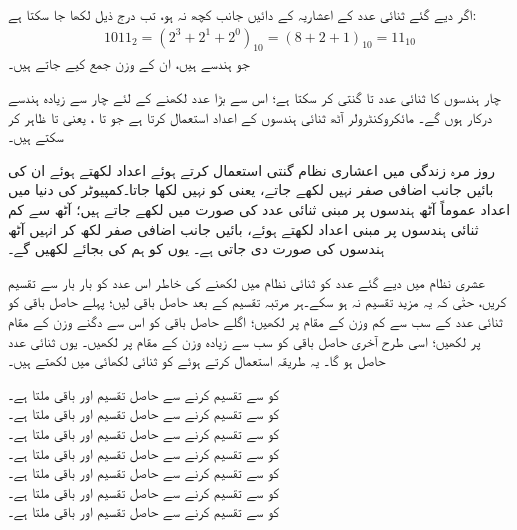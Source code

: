 اگر دیے گئے ثنائی عدد کے اعشاریہ کے دائیں جانب کچھ نہ ہو، تب درج ذیل لکھا جا سکتا ہے:
\begin{align}
1011_2=(2^3+2^1+2^0)_{10}=(8+2+1)_{10}=11_{10}
\end{align}
 جو ہندسے  ہیں، ان کے وزن جمع کیے جاتے ہیں۔

چار ہندسوں کا ثنائی عدد  تا  گنتی کر سکتا ہے؛ اس سے بڑا عدد لکھنے کے لئے چار سے زیادہ ہندسے درکار ہوں گے۔ مائکروکنٹرولر آٹھ ثنائی ہندسوں کے اعداد استعمال کرتا ہے جو  تا ، یعنی  تا  ظاہر کر سکتے ہیں۔

روز مرہ زندگی میں اعشاری نظام گنتی استعمال کرتے ہوئے اعداد لکھتے ہوئے ان کی بائیں جانب اضافی صفر نہیں لکھے جاتے، یعنی  کو  نہیں لکھا جاتا۔کمپیوٹر کی دنیا میں اعداد عموماً آٹھ ہندسوں پر مبنی ثنائی عدد کی صورت میں لکھے جاتے ہیں؛ آٹھ سے کم ثنائی ہندسوں پر مبنی اعداد لکھتے ہوئے، بائیں جانب اضافی صفر لکھ کر انہیں آٹھ ہندسوں کی صورت دی جاتی ہے۔ یوں  کو ہم  کی بجائے  لکھیں گے۔


عشری  نظام میں دیے گئے عدد کو ثنائی نظام میں لکھنے کی خاطر اس عدد کو بار بار  سے تقسیم کریں، حتٰی کہ یہ مزید تقسیم نہ ہو سکے۔ہر مرتبہ تقسیم کے بعد حاصل باقی لیں؛ پہلے حاصل باقی کو ثنائی عدد کے سب سے کم وزن کے مقام پر لکھیں؛ اگلے حاصل باقی کو اس سے دگنے وزن کے مقام پر لکھیں؛ اسی طرح آخری حاصل باقی کو سب سے زیادہ وزن کے مقام پر لکھیں۔ یوں ثنائی عدد حاصل ہو گا۔	یہ طریقہ استعمال کرتے ہوئے  کو ثنائی لکھائی میں لکھتے ہیں۔

 کو  سے تقسیم کرنے سے حاصل تقسیم  اور باقی  ملتا ہے۔\\
 کو  سے تقسیم کرنے سے حاصل تقسیم  اور باقی  ملتا ہے۔\\
 کو  سے تقسیم کرنے سے حاصل تقسیم  اور باقی  ملتا ہے۔\\
 کو  سے تقسیم کرنے سے حاصل تقسیم  اور باقی  ملتا ہے۔\\
 کو  سے تقسیم کرنے سے حاصل تقسیم  اور باقی  ملتا ہے۔\\
 کو  سے تقسیم کرنے سے حاصل تقسیم  اور باقی  ملتا ہے۔\\
 کو  سے تقسیم کرنے سے حاصل تقسیم  اور باقی  ملتا ہے۔


